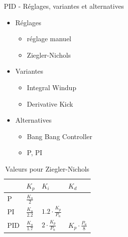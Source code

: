 \documentclass{beamer}
\begin{document}
		\begin{frame}{PID - Réglages, variantes et alternatives}
			\begin{minipage}{.45\textwidth}
                \begin{itemize}
                    \item Réglages
                        \begin{itemize}
                            \item réglage manuel
                            \item Ziegler-Nichols
                        \end{itemize}
                    \item Variantes
                        \begin{itemize}
                            \item Integral Windup
                            \item Derivative Kick
                        \end{itemize}
                    \item Alternatives
                        \begin{itemize}
                            \item Bang Bang Controller
                            \item P, PI
                        \end{itemize}
                \end{itemize}
			\end{minipage}
			\begin{minipage}{.45\textwidth}
                \begin{table}[]
                \centering
                \caption{Valeurs pour Ziegler-Nichols}
                \begin{tabular}{|l|l|l|l|}
                \hline
                   & $K_{p}$             & $K_{i}$                         & $K_{d}$                       \\ \hline
                P  & $\frac{K_{u}}{2}$   &                                 &                               \\ \hline
                PI & $\frac{K_{u}}{2.2}$ & $1.2\cdot\frac{K_{p}}{P_{u}}$ &                               \\ \hline
                PID & $\frac{K_{u}}{1.7}$ & $2\cdot\frac{K_{p}}{P_{u}}$   & $K_{p}\cdot\frac{P_{u}}{8}$ \\ \hline
                \end{tabular}
                \end{table}
			\end{minipage}
		\end{frame}
\end{document}
